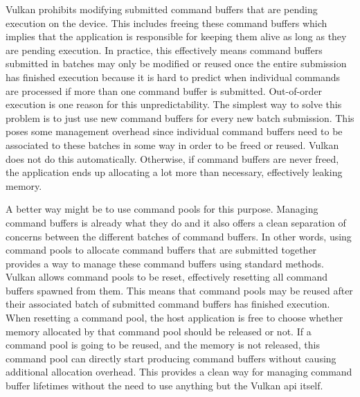 
        Vulkan prohibits modifying submitted command buffers that are pending execution on the device.
        This includes freeing these command buffers which implies that the application is responsible for keeping them alive as long as they are pending execution.
        In practice, this effectively means command buffers submitted in batches may only be modified or reused once the entire submission has finished execution because it is hard to predict when individual commands are processed if more than one command buffer is submitted.
        Out-of-order execution is one reason for this unpredictability.
        The simplest way to solve this problem is to just use new command buffers for every new batch submission.
        This poses some management overhead since individual command buffers need to be associated to these batches in some way in order to be freed or reused.
        Vulkan does not do this automatically.
        Otherwise, if command buffers are never freed, the application ends up allocating a lot more than necessary, effectively leaking memory.

        A better way might be to use command pools for this purpose.
        Managing command buffers is already what they do and it also offers a clean separation of concerns between the different batches of command buffers.
        In other words, using command pools to allocate command buffers that are submitted together provides a way to manage these command buffers using standard methods.
        Vulkan allows command pools to be reset, effectively resetting all command buffers spawned from them.
        This means that command pools may be reused after their associated batch of submitted command buffers has finished execution.
        When resetting a command pool, the host application is free to choose whether memory allocated by that command pool should be released or not.
        If a command pool is going to be reused, and the memory is not released, this command pool can directly start producing command buffers without causing additional allocation overhead.
        This provides a clean way for managing command buffer lifetimes without the need to use anything but the Vulkan \gls{api} itself.

